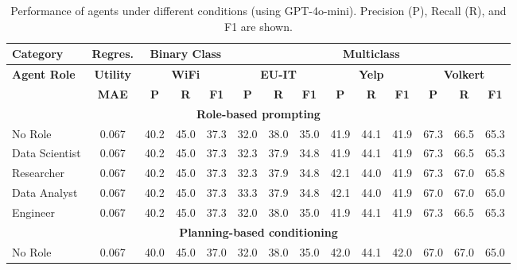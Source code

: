 




\begin{table}[t]
\centering
\scriptsize
\setlength{\tabcolsep}{2pt}
\renewcommand{\arraystretch}{1.2}
\caption{Performance of agents under different conditions (using GPT-4o-mini). Precision (P), Recall (R), and F1 are shown.}

\label{tab:specialaiztion_result}
\vspace{-3mm}
\renewcommand{\arraystretch}{0.9}
\begin{tabular}{l|c|ccc|ccc|ccc|ccc}
\toprule
\textbf{Category} & \textbf{Regres.} & \multicolumn{3}{c|}{\textbf{Binary Class}} & \multicolumn{9}{c}{\textbf{Multiclass}} \\
\midrule
\multirow{2}{*}{\textbf{Agent Role}} 
& \multicolumn{1}{c|}{\textbf{Utility}} 
& \multicolumn{3}{c|}{\textbf{WiFi}} 
& \multicolumn{3}{c|}{\textbf{EU-IT}} 
& \multicolumn{3}{c|}{\textbf{Yelp}} 
& \multicolumn{3}{c}{\textbf{Volkert}} \\ 
\cmidrule(lr){2-2} \cmidrule(lr){3-5} \cmidrule(lr){6-8} \cmidrule(lr){9-11} \cmidrule(lr){12-14}
& \textbf{MAE} 
& \textbf{P} & \textbf{R} & \textbf{F1} 
& \textbf{P} & \textbf{R} & \textbf{F1} 
& \textbf{P} & \textbf{R} & \textbf{F1} 
& \textbf{P} & \textbf{R} & \textbf{F1} \\
\bottomrule
\multicolumn{14}{c}{\cellcolor{gray!20}\textbf{Role-based prompting}} \\
No Role        & 0.067 & 40.2 & 45.0 & 37.3  
& 32.0 & 38.0 & 35.0 
& 41.9 & 44.1 & 41.9 
& 67.3 & 66.5 & 65.3 \\

Data Scientist & 0.067 & 40.2 & 45.0 & 37.3 
& 32.3 & 37.9 & 34.8 
& 41.9 & 44.1 & 41.9 
& 67.3 & 66.5 & 65.3 \\

Researcher     & 0.067 & 40.2 & 45.0 & 37.3 
& 32.3 & 37.9 & 34.8 
& 42.1 & 44.0 & 41.9 
& 67.3 & 67.0 & 65.8 \\

Data Analyst   & 0.067 & 40.2 & 45.0 & 37.3 
& 33.3 & 37.9 & 34.8 
& 42.1 & 44.0 & 41.9
& 67.0 & 67.0 & 65.0 \\

Engineer       & 0.067 & 40.2 & 45.0 & 37.3 
& 32.0 & 38.0 & 35.0 
& 41.9 & 44.1 & 41.9 
& 67.3 & 66.5 & 65.3 \\

\multicolumn{14}{c}{\cellcolor{gray!20}\textbf{Planning-based conditioning}} \\
No Role        & 0.067 & 40.0 & 45.0 & 37.0 
& 32.0 & 38.0 & 35.0 
& 42.0 & 44.1 & 42.0
& 67.0 & 67.0 & 65.0 \\


\end{tabular}
\end{table}
